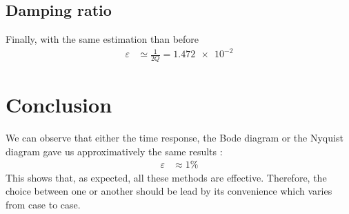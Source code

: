 \documentclass[a4paper, 12pt]{article}
\begin{document}
	\subsection{Damping ratio}
	Finally, with the same estimation than before
	\begin{align*}
		\varepsilon & \simeq \frac{1}{2 Q} = \num{1.472e-2}
	\end{align*}
	\section{Conclusion}
	We can observe that either the time response, the Bode diagram or the Nyquist diagram gave us approximatively the same results :
	\begin{align*}
		\varepsilon & \approx 1 \%
	\end{align*}
	This shows that, as expected, all these methods are effective. Therefore, the choice between one or another should be lead by its convenience which varies from case to case.
\end{document}
